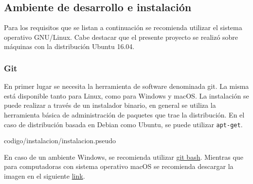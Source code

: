     
    \subsection{Ambiente de desarrollo e instalación}
    
    Para los requisitos que se listan a continuación se recomienda utilizar el sistema operativo GNU/Linux. Cabe destacar que el presente proyecto se realizó sobre máquinas con la distribución Ubuntu 16.04.
    
    
        \subsubsection{Git}
        En primer lugar se necesita la herramienta de software denominada git. La misma está disponible tanto para Linux, como para Windows y macOS. La instalación se puede realizar a través de un instalador binario, en general se utiliza la herramienta básica de administración de paquetes que trae la distribución. En el caso de distribución basada en Debian como Ubuntu, se puede utilizar \texttt{apt-get}.
        
        
                     {codigo/instalacion/instalacion.pseudo}
        
        En caso de un ambiente Windows, se recomienda utilizar \href{https://git-for-windows.github.io}{git bash}. Mientras que para computadoras con sistema operativo macOS se recomienda descargar la imagen en el siguiente \href{https://git-scm.com/download/mac}{link}.
        
